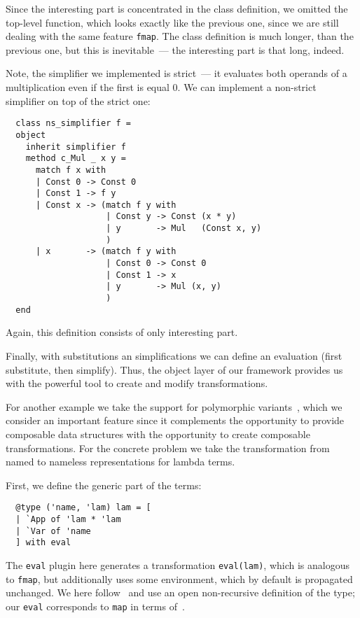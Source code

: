 \documentclass[submission,copyright,creativecommons]{eptcs}
\newcommand{\cd}[1]{\texttt{#1}}
\begin{document}
Since the interesting part is concentrated in the class definition, we omitted the top-level function, which looks exactly like the previous one,
since we are still dealing with the same feature \cd{fmap}. The class definition is much longer, than the previous one, but this is
inevitable~--- the interesting part is that long, indeed.

Note, the simplifier we implemented is strict~--- it evaluates both operands of a multiplication even if the first is equal 0. We can implement
a non-strict simplifier on top of the strict one:

\begin{lstlisting}
  class ns_simplifier f =
  object 
    inherit simplifier f 
    method c_Mul _ x y =
      match f x with
      | Const 0 -> Const 0
      | Const 1 -> f y
      | Const x -> (match f y with
                    | Const y -> Const (x * y)
                    | y       -> Mul   (Const x, y)
                    )
      | x       -> (match f y with
                    | Const 0 -> Const 0
                    | Const 1 -> x
                    | y       -> Mul (x, y)
                    )
  end
\end{lstlisting}

Again, this definition consists of only interesting part.

Finally, with substitutions an simplifications we can define an evaluation (first substitute, then simplify). Thus, the object layer of our framework
provides us with the powerful tool to create and modify transformations.

For another example we take the support for polymorphic variants~\cite{PolyVar,PolyVarReuse}, which we consider an important feature since it complements
the opportunity to provide composable data structures with the opportunity to create composable transformations. For the concrete problem we take the
transformation from named to nameless representations for lambda terms.

First, we define the generic part of the terms:

\begin{lstlisting}
  @type ('name, 'lam) lam = [
  | `App of 'lam * 'lam
  | `Var of 'name
  ] with eval
\end{lstlisting}

The \cd{eval} plugin here generates a transformation \cd{eval(lam)}, which is analogous to \cd{fmap}, but additionally uses some environment, which
by default is propagated unchanged. We here follow~\cite{PolyVarReuse} and use an open non-recursive definition of the type; our \cd{eval} corresponds
to \cd{map} in terms of~\cite{Visitors}.
\end{document}
